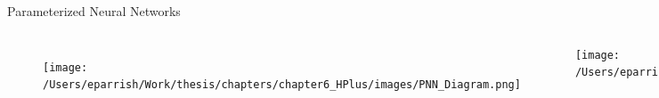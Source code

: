 \documentclass[aspectratio=169,xcolor=table]{beamer}
\begin{document}
\begin{frame}[t]{Parameterized Neural Networks}
\begin{columns}
\begin{figure}
\begin{columns}
        \texttt{[image: /Users/eparrish/Work/thesis/chapters/chapter6\_HPlus/images/PNN\_Diagram.png]}  
        \caption{\tiny \cite{PNN}}
        \end{columns}
      \end{figure}
      \texttt{[image: /Users/eparrish/Work/thesis/chapters/chapter6\_HPlus/images/kFoldDiagram\_noValid.pdf]}
      \begin{table}
        \end{table}


\end{columns}
\end{frame}
\end{document}
